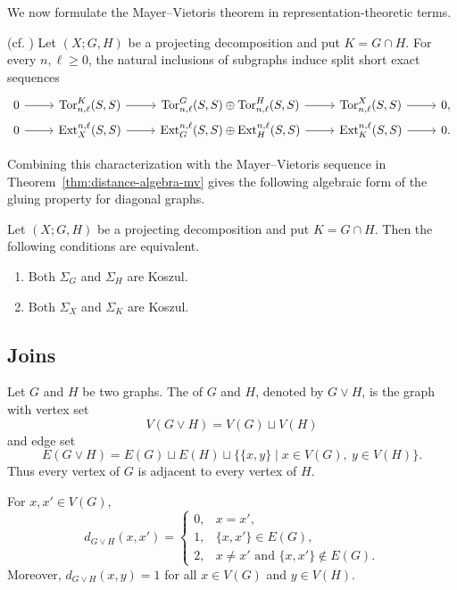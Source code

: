 \documentclass[a4paper,leqno]{amsart}
\begin{document}
We now formulate the Mayer--Vietoris theorem in representation-theoretic terms.

\begin{thm}\textnormal{(cf. \cite[Theorem~6.6]{HW17})}\label{thm:distance-algebra-mv}
Let $(X;G,H)$ be a projecting decomposition and put $K=G\cap H$.
For every $n,\ell\geq0$, the natural inclusions of subgraphs induce split short exact sequences
\[\begin{tikzcd}[row sep=0]
	0 \ar[r] & \Tor_{n,\ell}^K(S,S) \ar[r] & \Tor_{n,\ell}^G(S,S)\oplus \Tor_{n,\ell}^H(S,S)\ar[r]  & \Tor_{n,\ell}^X(S,S)\ar[r] & 0, \\
    0\ar[r] & \Ext^{n,\ell}_X(S,S)\ar[r] & \Ext^{n,\ell}_G(S,S)\oplus\Ext^{n,\ell}_H(S,S)\ar[r] & \Ext^{n,\ell}_K(S,S)\ar[r] & 0.
\end{tikzcd}\]
\end{thm}

Combining this characterization with the Mayer--Vietoris sequence
in Theorem~\ref{thm:distance-algebra-mv} gives the following algebraic form of the gluing property for
diagonal graphs.

\begin{cor}\label{cor:mv-koszul}
Let $(X;G,H)$ be a projecting decomposition and put $K=G\cap H$.
Then the following conditions are equivalent.
\begin{enumerate}
    \item Both $\Sigma_G$ and $\Sigma_H$ are Koszul.
    \item Both $\Sigma_X$ and $\Sigma_K$ are Koszul.
\end{enumerate}
\end{cor}


\subsection{Joins}\label{subsec:join}
\begin{dfn}
    Let $G$ and $H$ be two graphs. The  of $G$ and $H$, denoted by $G\vee H$, is the graph with vertex set
$$V(G\vee H)=V(G)\sqcup V(H)$$
and edge set
$$E(G\vee H)=E(G)\sqcup E(H)\sqcup\bigl\{\{x,y\}\mid x\in V(G),\ y\in V(H)\bigr\}.$$
Thus every vertex of $G$ is adjacent to every vertex of $H$.
\end{dfn}


\begin{lem}\label{lem:join-distance}
For $x,x'\in V(G)$,
\[
d_{G\vee H}(x,x')=
\begin{cases}
0, & x=x',\\
1, & \{x,x'\}\in E(G),\\
2, & x\neq x'\text{ and }\{x,x'\}\notin E(G).
\end{cases}
\]
Moreover, $d_{G\vee H}(x,y)=1$ for all $x\in V(G)$ and $y\in V(H)$.
\end{lem}
\end{document}
